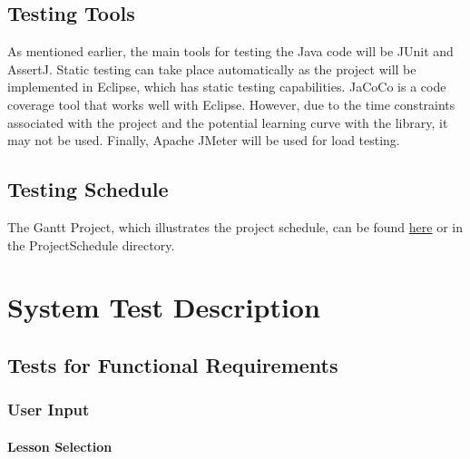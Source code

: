 \documentclass[12pt, titlepage]{article}
\begin{document}
\subsection{Testing Tools}
\label{sec:tt}

	As mentioned earlier, {\color{cyan}the main tools for testing the Java code will be JUnit and AssertJ}. Static testing can take place automatically as the project will be implemented in Eclipse, which has static testing capabilities. JaCoCo is a code coverage tool that works well with Eclipse. However, due to the time constraints associated with the project and the potential learning curve with the library, it may not be used. Finally, Apache JMeter will be used for load testing.

\subsection{Testing Schedule}
\label{sec:ts}
		
The Gantt Project, which illustrates the project schedule, can be found \href{run:../../ProjectSchedule/Gantt_Project.gan}{here} or in the ProjectSchedule directory. 

\section{System Test Description}
	
\subsection{Tests for Functional Requirements}

\subsubsection{User Input}
		
\paragraph{Lesson Selection}
\end{document}
